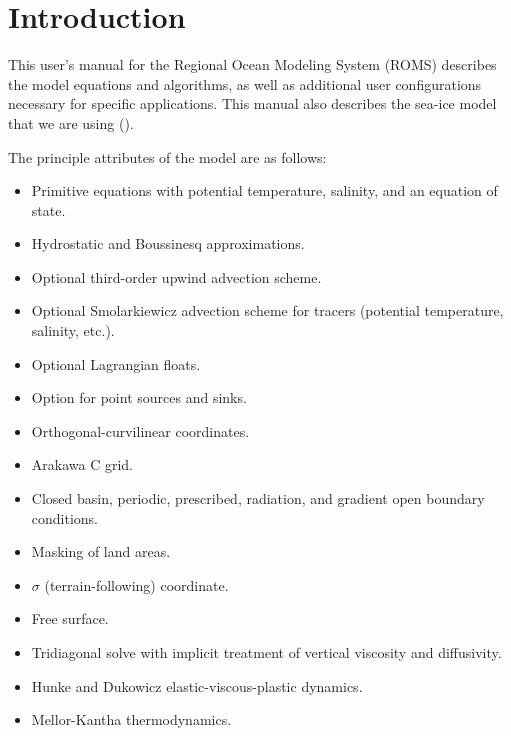 \setcounter{page}{1}
\section{Introduction}
\label{Intro}
This user's manual for the Regional Ocean Modeling System (ROMS)
describes the model equations and algorithms, as well as
additional user configurations necessary for specific applications.
This manual also describes the sea-ice model
that we are using (\cite{Budgell05}).

The principle attributes of the model are as follows:
\begin{klist}
 \mbox{}
\begin{itemize}
  \item Primitive equations with potential temperature, salinity, and an
equation of state.
  \item Hydrostatic and Boussinesq approximations.
  \item Optional third-order upwind advection scheme.
  \item Optional Smolarkiewicz advection scheme for tracers
    (potential temperature, salinity, etc.).
  \item Optional Lagrangian floats.
  \item Option for point sources and sinks.
\end {itemize}
 \mbox{}
\begin{itemize}
  \item Orthogonal-curvilinear coordinates.
  \item Arakawa C grid.
  \item Closed basin, periodic, prescribed, radiation, and
    gradient open boundary conditions.
  \item Masking of land areas.
\end {itemize}
 \mbox{}
\begin{itemize}
  \item $\sigma$ (terrain-following) coordinate.
  \item Free surface.
  \item Tridiagonal solve with implicit treatment of vertical
    viscosity and diffusivity.
\end {itemize}
 \mbox{}
\begin{itemize}
  \item Hunke and Dukowicz elastic-viscous-plastic dynamics.
  \item Mellor-Kantha thermodynamics.

\end{itemize}
\end{klist}
